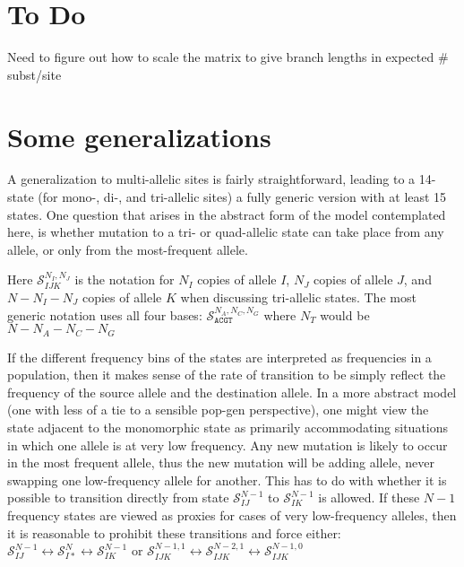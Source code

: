 \documentclass{llncs}
\newcommand{\virtPopSize}{\ensuremath{N}}
\newcommand{\pomoState}[3]{\ensuremath{\mathcal{S}_{#1#2}^{#3}}}}
\newcommand{\triPomoState}[5]{\ensuremath{\mathcal{S}_{#1#2#3}^{#4,#5}}}}
\newcommand{\quadPomoState}[3]{\ensuremath{\mathcal{S}_{\texttt{ACGT}}^{#1,#2,#3}}}}
\begin{document}
\begin{compactitem}
\end{compactitem}

\section{To Do}
\begin{compactitem}
    \item Need to figure out how to scale the matrix to give branch lengths in expected \# subst/site
\end{compactitem}

\section{Some generalizations}
A generalization to multi-allelic sites is fairly straightforward, leading to a 14-state
    (for mono-, di-, and tri-allelic sites) a fully generic version with at least 15 states.
One question that arises in the abstract form of the model contemplated here, is whether mutation
    to a tri- or quad-allelic state can take place from any allele, or only from the most-frequent
    allele.

Here $\triPomoState{I}{J}{K}{N_I}{N_J}$ is the notation for $N_I$ copies of allele $I$, $N_J$ copies
    of allele $J$, and $\virtPopSize-N_I -N_J$ copies of allele $K$ when discussing tri-allelic states.
The most generic notation uses all four bases: $\quadPomoState{N_A}{N_C}{N_G}$ where $N_T$ would be $\virtPopSize-N_A - N_C - N_G$

If the different frequency bins of the states are interpreted as frequencies in a population, then
    it makes sense of the rate of transition to be simply reflect the frequency of the source allele 
    and the destination allele.
In a more abstract model (one with less of a tie to a sensible pop-gen perspective), one might view
    the state adjacent to the monomorphic state as primarily accommodating situations in which one
    allele is at very low frequency.
Any new mutation is likely to occur in the most frequent allele, thus the new mutation will be
    adding allele, never swapping one low-frequency allele for another.
This has to do with whether it is possible to transition directly from state $\pomoState{I}{J}{N-1}$ to
    $\pomoState{I}{K}{N-1}$ is allowed.
If these $N-1$ frequency states are viewed as proxies for cases of very low-frequency alleles, then 
    it is reasonable to prohibit these transitions and force either:
    $\pomoState{I}{J}{N-1} \leftrightarrow \pomoState{I}{\ast}{N} \leftrightarrow \pomoState{I}{K}{N-1}$
    or $\triPomoState{I}{J}{K}{N-1}{1} \leftrightarrow \triPomoState{I}{J}{K}{N-2}{1} \leftrightarrow \triPomoState{I}{J}{K}{N-1}{0}$
\end{document}

